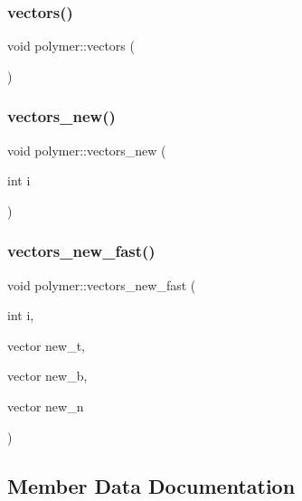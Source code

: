 \hypertarget{classpolymer_a0167c13d59c6840673a394c01b87f229}{}\label{classpolymer_a0167c13d59c6840673a394c01b87f229} 
\subsubsection{\texorpdfstring{vectors()}{vectors()}}
{\footnotesize\ttfamily void polymer\+::vectors (\begin{DoxyParamCaption}{ }\end{DoxyParamCaption})}

\hypertarget{classpolymer_a9c3aef8cf024d559254771d849edf0ee}{}\label{classpolymer_a9c3aef8cf024d559254771d849edf0ee} 
\subsubsection{\texorpdfstring{vectors\+\_\+new()}{vectors\_new()}}
{\footnotesize\ttfamily void polymer\+::vectors\+\_\+new (\begin{DoxyParamCaption}\item[{int}]{i }\end{DoxyParamCaption})}

\hypertarget{classpolymer_a7cdc581f953eb562e1ca66743b943066}{}\label{classpolymer_a7cdc581f953eb562e1ca66743b943066} 
\subsubsection{\texorpdfstring{vectors\+\_\+new\+\_\+fast()}{vectors\_new\_fast()}}
{\footnotesize\ttfamily void polymer\+::vectors\+\_\+new\+\_\+fast (\begin{DoxyParamCaption}\item[{int}]{i,  }\item[{vector}]{new\+\_\+t,  }\item[{vector}]{new\+\_\+b,  }\item[{vector}]{new\+\_\+n }\end{DoxyParamCaption})}



\subsection{Member Data Documentation}
\hypertarget{classpolymer_ac4f3c065dd8bb61def0439b66a15f963}{}\label{classpolymer_ac4f3c065dd8bb61def0439b66a15f963} 
